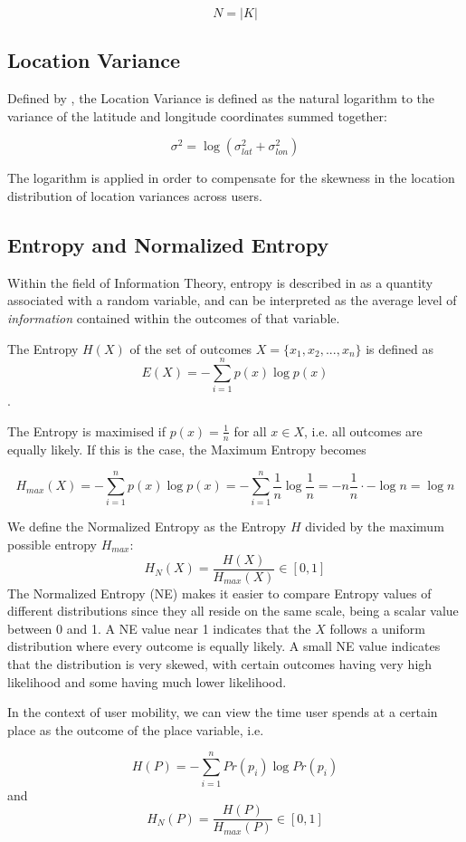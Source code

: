 $$N = |K|$$

\subsection{Location Variance}
Defined by \cite{Saeb2015}, the Location Variance is defined as the natural logarithm to the variance of the latitude and longitude coordinates summed together: 

$$\sigma^2 = \log (\sigma_{lat}^2 + \sigma_{lon}^2)$$

The logarithm is applied in order to compensate for the skewness in the location distribution of location variances across users.

\subsection{Entropy and Normalized Entropy}
Within the field of Information Theory, entropy is described in \cite{information-theory} as a quantity associated with a random variable, and can be interpreted as the average level of \textit{information} contained within the outcomes of that variable. 

The Entropy $H(X)$ of the set of outcomes $X = \{x_1, x_2, ..., x_n\}$ is defined as
$$E(X) = -\sum_{i=1}^{n} p(x) \log p(x)$$. 

The Entropy is maximised if $p(x) = \frac{1}{n}$ for all $x \in X$, i.e. all outcomes are equally likely. If this is the case, the Maximum Entropy becomes 


$$H_{max}(X) = - \sum_{i=1}^{n} p(x) \log p(x) = - \sum_{i=1}^{n} \frac{1}{n} \log \frac{1}{n} = -n \frac{1}{n} \cdot -\log n = \log n $$

We define the Normalized Entropy as the Entropy $H$ divided by the maximum possible entropy $H_{max}$:
$$H_N(X) = \frac{H(X)}{H_{max}(X)} \in [0,1]$$
The Normalized Entropy (NE) makes it easier to compare Entropy values of different distributions since they all reside on the same scale, being a scalar value between  0 and 1. A NE value near 1 indicates that the $X$ follows a uniform distribution where every outcome is equally likely. A small NE value indicates that the distribution is very skewed, with certain outcomes having very high likelihood and some having much lower likelihood. 

In the context of user mobility, we can view the time user spends at a certain place as the outcome of the place variable, i.e. 

$$H(P) = - \sum_{i=1}^{n} Pr(p_i) \log Pr(p_i)$$ and
$$H_N(P) = \frac{H(P)}{H_{max}(P)} \in [0,1]$$

